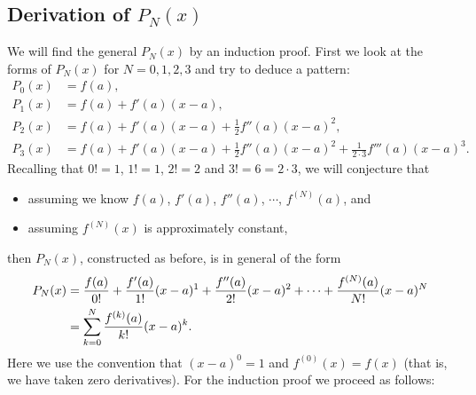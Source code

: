 \newpage\subsection{Derivation of $P_N(x)$\label{SubsectionForDerivP_N}}
We will find the general $P_N(x)$ by an induction proof.
First we look at the forms of $P_N(x)$ for $N=0,1,2,3$ and
try to deduce a pattern:
\begin{align*}
P_0(x)&=f(a),\\
P_1(x)&=f(a)+f'(a)(x-a),\\
P_2(x)&=f(a)+f'(a)(x-a)+\frac12f''(a)(x-a)^2,\\
P_3(x)&=f(a)+f'(a)(x-a)+\frac12f''(a)(x-a)^2+\frac1{2\cdot3}f'''(a)(x-a)^3.
\end{align*}
Recalling that $0!=1$, $1!=1$, $2!=2$ and $3!=6=2\cdot3$, we
will conjecture that 
\begin{itemize}
\item assuming we know $f(a)$, $f'(a)$, $f''(a)$, $\cdots$, $f^{(N)}(a)$, and
\item assuming $f^{(N)}(x)$ is approximately constant,
\end{itemize}
then $P_N(x)$, constructed as before, is in general of the form
\begin{align}
P_N(x)&=\frac{f(a)}{0!}+\frac{f'(a)}{1!}(x-a)^1+\frac{f''(a)}{2!}(x-a)^2
       +\cdots+\frac{f^{(N)}(a)}{N!}(x-a)^N\notag\\
      &=\sum_{k=0}^N\frac{f^{(k)}(a)}{k!}(x-a)^k.\label{DefOfP_N(x)}\end{align}
Here we use the convention that $(x-a)^0=1$ and $f^{(0)}(x)=f(x)$
(that is, we have taken zero derivatives).
For the induction proof we proceed as follows:
